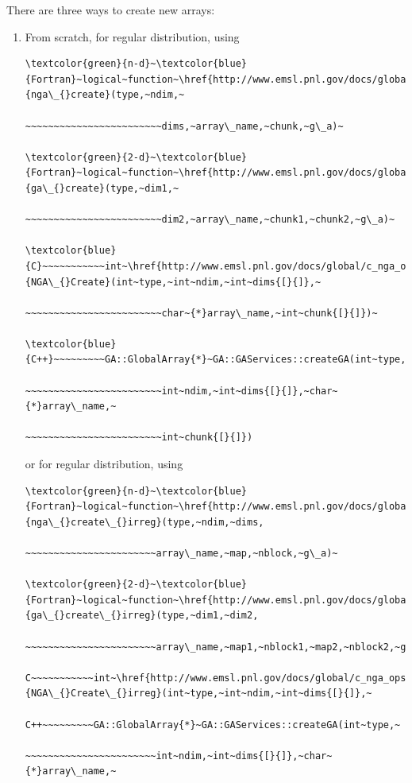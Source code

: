 There are three ways to create new arrays:
\begin{enumerate}
\item From scratch, for regular distribution, using

\begin{verbatim}
\textcolor{green}{n-d}~\textcolor{blue}{Fortran}~logical~function~\href{http://www.emsl.pnl.gov/docs/global/ga_ops.html\#ga_create}{nga\_{}create}(type,~ndim,~

~~~~~~~~~~~~~~~~~~~~~~~~dims,~array\_name,~chunk,~g\_a)~

\textcolor{green}{2-d}~\textcolor{blue}{Fortran}~logical~function~\href{http://www.emsl.pnl.gov/docs/global/ga_ops.html\#ga_create}{ga\_{}create}(type,~dim1,~

~~~~~~~~~~~~~~~~~~~~~~~~dim2,~array\_name,~chunk1,~chunk2,~g\_a)~

\textcolor{blue}{C}~~~~~~~~~~~int~\href{http://www.emsl.pnl.gov/docs/global/c_nga_ops.html\#ga_create}{NGA\_{}Create}(int~type,~int~ndim,~int~dims{[}{]},~

~~~~~~~~~~~~~~~~~~~~~~~~char~{*}array\_name,~int~chunk{[}{]})~

\textcolor{blue}{C++}~~~~~~~~~GA::GlobalArray{*}~GA::GAServices::createGA(int~type,~

~~~~~~~~~~~~~~~~~~~~~~~~int~ndim,~int~dims{[}{]},~char~{*}array\_name,~

~~~~~~~~~~~~~~~~~~~~~~~~int~chunk{[}{]})
\end{verbatim}
or for regular distribution, using
\begin{verbatim}
\textcolor{green}{n-d}~\textcolor{blue}{Fortran}~logical~function~\href{http://www.emsl.pnl.gov/docs/global/ga_ops.html\#ga_create_irreg}{nga\_{}create\_{}irreg}(type,~ndim,~dims,

~~~~~~~~~~~~~~~~~~~~~~~array\_name,~map,~nblock,~g\_a)~

\textcolor{green}{2-d}~\textcolor{blue}{Fortran}~logical~function~\href{http://www.emsl.pnl.gov/docs/global/ga_ops.html\#ga_create_irreg}{ga\_{}create\_{}irreg}(type,~dim1,~dim2,

~~~~~~~~~~~~~~~~~~~~~~~array\_name,~map1,~nblock1,~map2,~nblock2,~g\_a)~

C~~~~~~~~~~~int~\href{http://www.emsl.pnl.gov/docs/global/c_nga_ops.html\#ga_create_irreg}{NGA\_{}Create\_{}irreg}(int~type,~int~ndim,~int~dims{[}{]},~

C++~~~~~~~~~GA::GlobalArray{*}~GA::GAServices::createGA(int~type,~

~~~~~~~~~~~~~~~~~~~~~~~int~ndim,~int~dims{[}{]},~char~{*}array\_name,~


\end{verbatim}
\end{enumerate}
